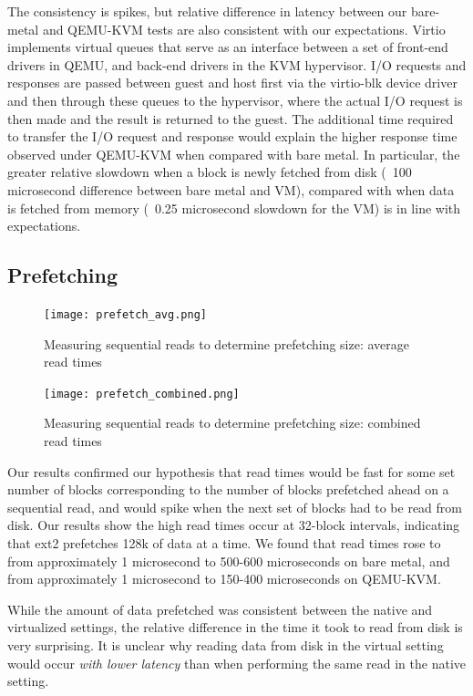 \documentclass[letterpaper,twocolumn,10pt]{article}
\begin{document}
The consistency is spikes, but relative difference in latency between our bare-metal and QEMU-KVM tests are also consistent with our expectations. Virtio implements virtual queues that serve as an interface between a set of front-end drivers in QEMU, and back-end drivers in the KVM hypervisor. I/O requests and responses are passed between guest and host first via the virtio-blk device driver and then through these queues to the hypervisor, where the actual I/O request is then made and the result is returned to the guest. The additional time required to transfer the I/O request and response would explain the higher response time observed under QEMU-KVM when compared with bare metal. In particular, the greater relative slowdown when a block is newly fetched from disk (~100 microsecond difference between bare metal and VM), compared with when data is fetched from memory (~0.25 microsecond slowdown for the VM) is in line with expectations. 

\subsection{Prefetching}
\begin{figure}[!ht]
\texttt{[image: prefetch\_avg.png]}
\caption{Measuring sequential reads to determine prefetching size: average read times}
\end{figure}
\begin{figure}[!ht]
\texttt{[image: prefetch\_combined.png]}
\caption{Measuring sequential reads to determine prefetching size: combined read times}
\end{figure}
Our results confirmed our hypothesis that read times would be fast for some set number of blocks corresponding to the number of blocks prefetched ahead on a sequential read, and would spike when the next set of blocks had to be read from disk. Our results show the high read times occur at 32-block intervals, indicating that ext2 prefetches 128k of data at a time. We found that read times rose to from approximately 1 microsecond to 500-600 microseconds on bare metal, and from approximately 1 microsecond to 150-400 microseconds on QEMU-KVM. 

While the amount of data prefetched was consistent between the native and virtualized settings, the relative difference in the time it took to read from disk is very surprising. It is unclear why reading data from disk in the virtual setting would occur \textit{with lower latency} than when performing the same read in the native setting. 
\end{document}
